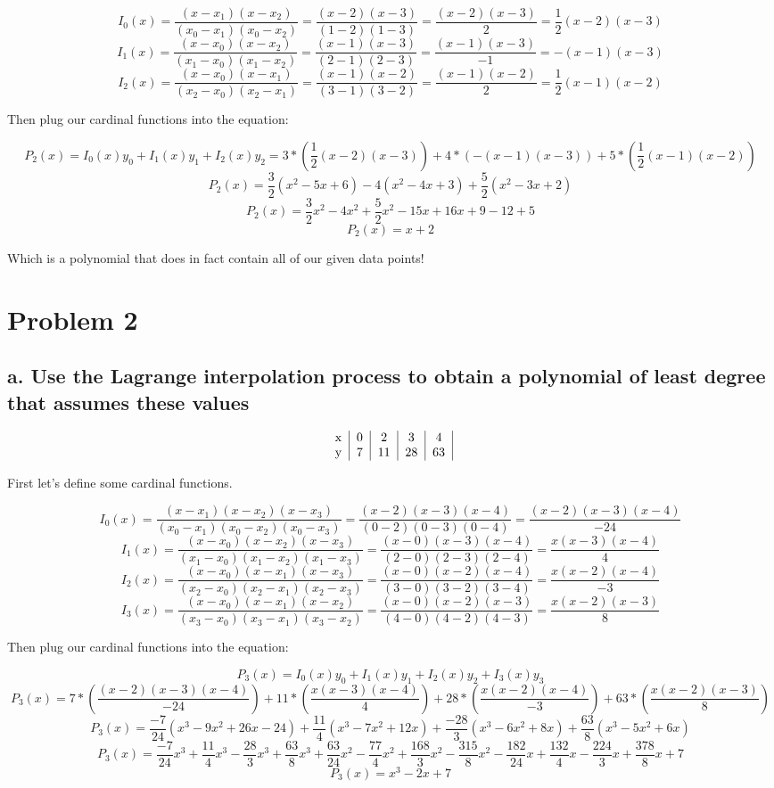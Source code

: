 \documentclass[]{article}
\begin{document}
\[I_0(x)=\frac{(x - x_1)(x-x_2)}{(x_0-x_1)(x_0-x_2)}=\frac{(x-2)(x-3)}{(1-2)(1-3)}=\frac{(x-2)(x-3)}{2}=\frac12(x-2)(x-3)\]
\[I_1(x)=\frac{(x - x_0)(x-x_2)}{(x_1-x_0)(x_1-x_2)}=\frac{(x-1)(x-3)}{(2-1)(2-3)}=\frac{(x-1)(x-3)}{-1}=-(x-1)(x-3)\]
\[I_2(x)=\frac{(x - x_0)(x-x_1)}{(x_2-x_0)(x_2-x_1)}=\frac{(x-1)(x-2)}{(3-1)(3-2)}=\frac{(x-1)(x-2)}{2}=\frac12(x-1)(x-2)\]

Then plug our cardinal functions into the equation:

\[P_2(x)=I_0(x)y_0+I_1(x)y_1+I_2(x)y_2 = 3*(\frac12(x-2)(x-3)) + 4*(-(x-1)(x-3)) + 5*(\frac12(x-1)(x-2))\]
\[P_2(x) = \frac32(x^2-5x+6)-4(x^2-4x+3)+\frac52(x^2-3x+2)\]
\[P_2(x) = \frac32x^2-4x^2+\frac52x^2-15x+16x+9-12+5\] \[P_2(x) = x+2\]

Which is a polynomial that does in fact contain all of our given data
points!

\section{Problem 2}\label{problem-2}

\subsection{a. Use the Lagrange interpolation process to obtain a
polynomial of least degree that assumes these
values}\label{a.-use-the-lagrange-interpolation-process-to-obtain-a-polynomial-of-least-degree-that-assumes-these-values}

\[
\begin{tabular}{c|c|c|c|c|}
x & 0 & 2 & 3 & 4\\
y & 7 & 11 & 28 & 63
\end{tabular}
\]

First let's define some cardinal functions.

\[I_0(x) = \frac{(x-x_1)(x-x_2)(x-x_3)}{(x_0-x_1)(x_0-x_2)(x_0-x_3)}=\frac{(x-2)(x-3)(x-4)}{(0-2)(0-3)(0-4)}=\frac{(x-2)(x-3)(x-4)}{-24}\]
\[I_1(x)=\frac{(x-x_0)(x-x_2)(x-x_3)}{(x_1-x_0)(x_1-x_2)(x_1-x_3)}=\frac{(x-0)(x-3)(x-4)}{(2-0)(2-3)(2-4)}=\frac{x(x-3)(x-4)}{4}\]
\[I_2(x)=\frac{(x-x_0)(x-x_1)(x-x_3)}{(x_2-x_0)(x_2-x_1)(x_2-x_3)}=\frac{(x-0)(x-2)(x-4)}{(3-0)(3-2)(3-4)}=\frac{x(x-2)(x-4)}{-3}\]
\[I_3(x)=\frac{(x-x_0)(x-x_1)(x-x_2)}{(x_3-x_0)(x_3-x_1)(x_3-x_2)}=\frac{(x-0)(x-2)(x-3)}{(4-0)(4-2)(4-3)}=\frac{x(x-2)(x-3)}{8}\]

Then plug our cardinal functions into the equation:

\[P_3(x)=I_0(x)y_0+I_1(x)y_1+I_2(x)y_2+I_3(x)y_3\]
\[P_3(x)=7*(\frac{(x-2)(x-3)(x-4)}{-24}) + 11*(\frac{x(x-3)(x-4)}{4}) + 28*(\frac{x(x-2)(x-4)}{-3}) + 63*(\frac{x(x-2)(x-3)}{8})\]
\[P_3(x)=\frac{-7}{24}(x^3-9x^2+26x-24)+\frac{11}4(x^3-7x^2+12x)+\frac{-28}3(x^3-6x^2+8x)+\frac{63}8(x^3-5x^2+6x)\]
\[P_3(x)=\frac{-7}{24}x^3+\frac{11}4x^3-\frac{28}3x^3+\frac{63}8x^3+\frac{63}{24}x^2-\frac{77}4x^2+\frac{168}3x^2-\frac{315}8x^2-\frac{182}{24}x+\frac{132}4x-\frac{224}3x+\frac{378}8x+7\]
\[P_3(x)=x^3-2x+7\]
\end{document}
